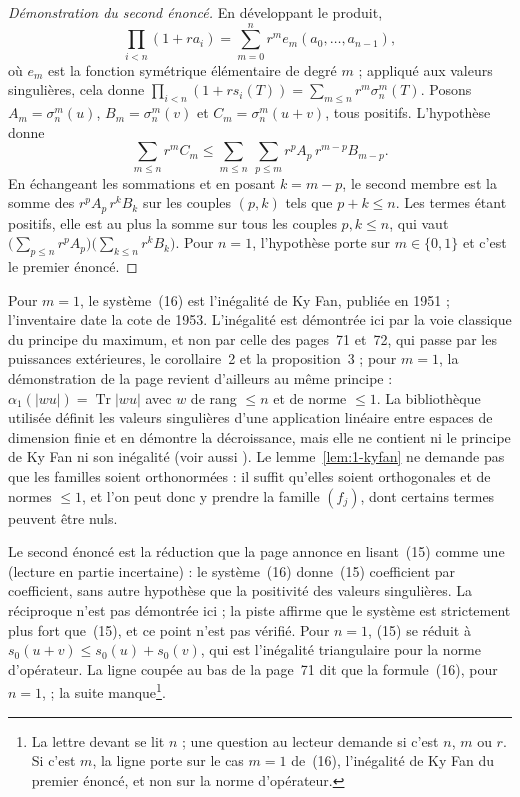 \begin{proof}[Démonstration du second énoncé]
En développant le produit,
\[ \textstyle\prod_{i<n}(1 + r a_i) = \sum_{m=0}^{n} r^m e_m(a_0, \ldots, a_{n-1}), \]
où $e_m$ est la fonction symétrique élémentaire de degré $m$ ; appliqué aux valeurs singulières, cela donne $\prod_{i<n}(1 + r s_i(T)) = \sum_{m \leq n} r^m \sigma_n^m(T)$. Posons $A_m = \sigma_n^m(u)$, $B_m = \sigma_n^m(v)$ et $C_m = \sigma_n^m(u+v)$, tous positifs. L'hypothèse donne
\[
  \sum_{m \leq n} r^m C_m \leq \sum_{m \leq n} \ \sum_{p \leq m} r^p A_p\, r^{m-p} B_{m-p} .
\]
En échangeant les sommations et en posant $k = m - p$, le second membre est la somme des $r^p A_p\, r^k B_k$ sur les couples $(p, k)$ tels que $p + k \leq n$. Les termes étant positifs, elle est au plus la somme sur tous les couples $p, k \leq n$, qui vaut $\bigl(\sum_{p \leq n} r^p A_p\bigr)\bigl(\sum_{k \leq n} r^k B_k\bigr)$. Pour $n = 1$, l'hypothèse porte sur $m \in \{0, 1\}$ et c'est le premier énoncé.
\end{proof}

\begin{remarque}
Pour $m = 1$, le système~(16) est l'inégalité de Ky Fan, publiée en 1951 \cite{fan1951} ; l'inventaire date la cote de 1953. L'inégalité est démontrée ici par la voie classique du principe du maximum, et non par celle des pages~71 et~72, qui passe par les puissances extérieures, le corollaire~2 et la proposition~3 ; pour $m = 1$, la démonstration de la page revient d'ailleurs au même principe : $\alpha_1(|wu|) = \operatorname{Tr}|wu|$ avec $w$ de rang $\leq n$ et de norme $\leq 1$. La bibliothèque utilisée définit les valeurs singulières d'une application linéaire entre espaces de dimension finie et en démontre la décroissance, mais elle ne contient ni le principe de Ky Fan ni son inégalité (voir aussi \cite{bhatia1997}). Le lemme~\ref{lem:1-kyfan} ne demande pas que les familles soient orthonormées : il suffit qu'elles soient orthogonales et de normes $\leq 1$, et l'on peut donc y prendre la famille $(f_j)$, dont certains termes peuvent être nuls.
\end{remarque}

\begin{remarque}
Le second énoncé est la réduction que la page annonce en lisant~(15) comme une  (lecture en partie incertaine) : le système~(16) donne~(15) coefficient par coefficient, sans autre hypothèse que la positivité des valeurs singulières. La réciproque n'est pas démontrée ici ; la piste affirme que le système est strictement plus fort que~(15), et ce point n'est pas vérifié. Pour $n = 1$, (15) se réduit à $s_0(u+v) \leq s_0(u) + s_0(v)$, qui est l'inégalité triangulaire pour la norme d'opérateur. La ligne coupée au bas de la page~71 dit que la formule~(16), pour $n = 1$,  ; la suite manque\footnote{La lettre devant  se lit $n$ ; une question au lecteur demande si c'est $n$, $m$ ou $r$. Si c'est $m$, la ligne porte sur le cas $m = 1$ de~(16), l'inégalité de Ky Fan du premier énoncé, et non sur la norme d'opérateur.}.
\end{remarque}


